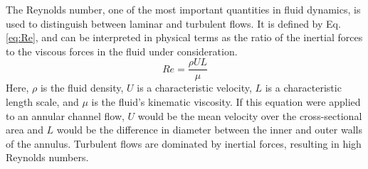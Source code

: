 The Reynolds number, one of the most important quantities in fluid dynamics, is used to distinguish between laminar and turbulent flows. It is defined by Eq. \ref{eq:Re}, and can be interpreted in physical terms as the ratio of the inertial forces to the viscous forces in the fluid under consideration.
\begin{equation}
  Re = \frac{\rho U L}{\mu}
  \label{eq:Re}
\end{equation}
Here, $\rho$ is the fluid density, $U$ is a characteristic velocity, $L$ is a characteristic length scale, and $\mu$ is the fluid's kinematic viscosity. If this equation were applied to an annular channel flow, $U$ would be the mean velocity over the cross-sectional area and $L$ would be the difference in diameter between the inner and outer walls of the annulus. Turbulent flows are dominated by inertial forces, resulting in high Reynolds numbers.

